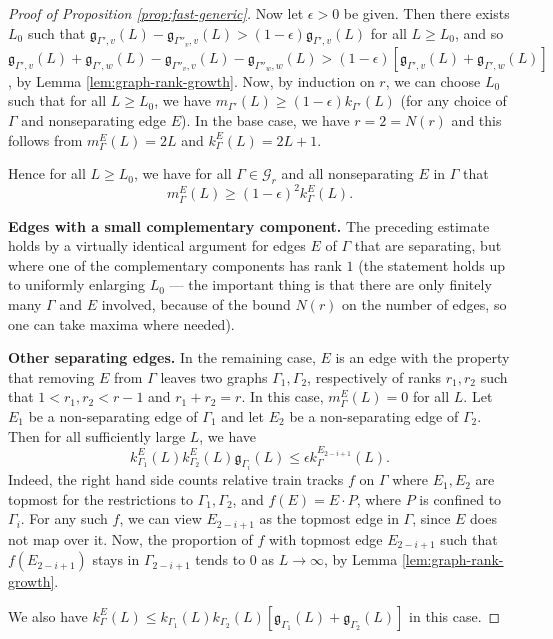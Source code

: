 \documentclass[11pt,oneside]{amsart}
\newcounter{ax}
\theoremstyle{definition}
\newcommand{\gate}{\mathfrak g}
\begin{document}
\begin{proof}[Proof of Proposition \ref{prop:fast-generic}]
Now let $\epsilon>0$ be given.  Then there exists $L_0$ such that $\gate_{\Gamma',v}(L)-\gate_{\Gamma''_v,v}(L)>(1-\epsilon)\gate_{\Gamma',v}(L)$ for all $L\geq L_0$, and so $\gate_{\Gamma',v}(L)+\gate_{\Gamma',w}(L)-\gate_{\Gamma''_v,v}(L)-\gate_{\Gamma''_w,w}(L)>(1-\epsilon)[\gate_{\Gamma',v}(L)+\gate_{\Gamma',w}(L)]$, by Lemma \ref{lem:graph-rank-growth}.
Now, by induction on $r$, we can choose $L_0$ such that for all $L\geq L_0$, we have $m_{\Gamma'}(L)\geq (1-\epsilon)k_{\Gamma'}(L)$ (for any choice of $\Gamma$ and nonseparating edge $E$).  In the base case, we have $r=2=N(r)$ and this follows from  $m_\Gamma^E(L)=2L$ and $k^E_\Gamma(L)=2L+1$.

Hence for all $L\geq L_0$, we have for all $\Gamma\in\mathcal G_r$ and all nonseparating $E$ in $\Gamma$ that 
$$m_\Gamma^E(L)\geq (1-\epsilon)^2k_{\Gamma}^E(L).$$

\textbf{Edges with a small complementary component.} The preceding estimate holds by a virtually identical argument for edges $E$ of $\Gamma$ that are separating, but where one of the complementary components has rank $1$ (the statement holds up to uniformly enlarging $L_0$ --- the important thing is that there are only finitely many $\Gamma$ and $E$ involved, because of the bound $N(r)$ on the number of edges, so one can take maxima where needed).  

\textbf{Other separating edges.}  In the remaining case, $E$ is an edge with the property that removing $E$ from $\Gamma$ leaves two graphs $\Gamma_1,\Gamma_2$, respectively of ranks $r_1,r_2$ such that $1<r_1,r_2<r-1$ and $r_1+r_2=r$.  In this case, $m_\Gamma^E(L)=0$ for all $L$.  Let $E_1$ be a non-separating edge of $\Gamma_1$ and let $E_2$ be a non-separating edge of $\Gamma_2$.  Then for all sufficiently large $L$, we have 
$$k^E_{\Gamma_1}(L)k^E_{\Gamma_2}(L)\gate_{\Gamma_i}(L)\leq \epsilon  k_\Gamma^{E_{2-i+1}}(L).$$
Indeed, the right hand side counts relative train tracks $f$ on $\Gamma$ where $E_1,E_2$ are topmost for the restrictions to $\Gamma_1,\Gamma_2$, and $f(E)=E\cdot P$, where $P$ is confined to $\Gamma_i$.  For any such $f$, we can view $E_{2-i+1}$ as the topmost edge in $\Gamma$, since $E$ does not map over it.  Now, the proportion of $f$ with topmost edge $E_{2-i+1}$ such that $f(E_{2-i+1})$ stays in $\Gamma_{2-i+1}$ tends to $0$ as $L\to\infty$, by Lemma \ref{lem:graph-rank-growth}.  


We also have $k_\Gamma^E(L)\leq k_{\Gamma_1}(L)k_{\Gamma_2}(L)[\gate_{\Gamma_1}(L)+\gate_{\Gamma_2}(L)]$ in this case.


\end{proof}
\end{document}
